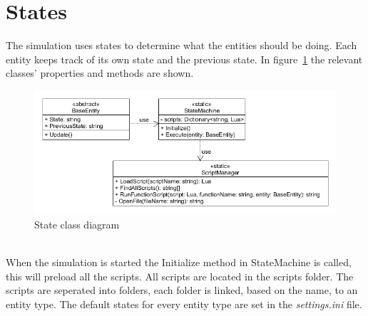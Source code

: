 \documentclass[10pt]{extarticle} %
\begin{document}
   \section {States}
   The simulation uses states to determine what the entities should be doing. Each entity keeps track of its own state and the previous state. In figure~\ref{fig:stateClassDiagram} the relevant classes' properties and methods are shown.
   \begin{figure}[h!]
   \includegraphics[width=\textwidth]{stateuml.png}
   \caption{State class diagram}
   \label{fig:stateClassDiagram}
   \end{figure}
   \\When the simulation is started the Initialize method in StateMachine is called, this will preload all the scripts. All scripts are located in the scripts folder. The scripts are seperated into folders, each folder is linked, based on the name, to an entity type.
   The default states for every entity type are set in the \emph{settings.ini} file.
\end{document}
